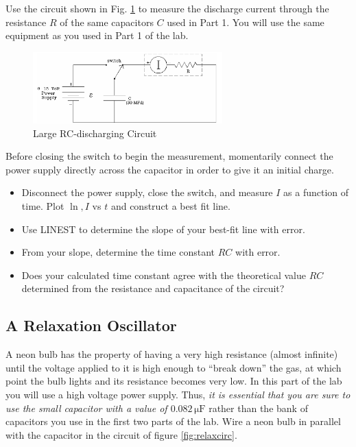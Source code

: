 Use the circuit shown in Fig. \ref{fig:largercdischarge} to measure the discharge current through the resistance $R$ of the same capacitors $C$ used in Part 1. You will use the same equipment as you used in Part 1 of the lab. \myskip

\begin{figure}[h]
    \begin{center}
        \includegraphics[width=0.65\textwidth]{./Exp4/pic/image7.png}
    \end{center}
    \caption{Large RC-discharging Circuit}
    \label{fig:largercdischarge}
\end{figure}

Before closing the switch to begin the measurement, momentarily connect the power supply directly across the capacitor in order to give it an initial charge.
\begin{itemize}
  \item Disconnect the power supply, close the switch, and measure $I$ as a function of time. Plot $\ln,I$ vs $t$ and construct a best fit line.
  \item Use LINEST to determine the slope of your best-fit line with error.
  \item From your slope, determine the time constant $RC$ with error.
  \item Does your calculated time constant agree with the theoretical value $RC$ determined from the resistance and capacitance of the circuit?
\end{itemize}

\subsection{A Relaxation Oscillator}

A neon bulb has the property of having a very high resistance (almost infinite) until the voltage applied to it is high enough to ``break down'' the gas, at which point the bulb lights and its resistance becomes very low. In this part of the lab you will use a high voltage power supply. Thus, \emph{it is essential that you are sure to use the small capacitor with a value of $0.082\,\mathrm{\mu F}$} rather than the bank of capacitors you use in the first two parts of the lab. Wire a neon bulb in parallel with the capacitor in the circuit of figure \ref{fig:relaxcirc}.\myskip

